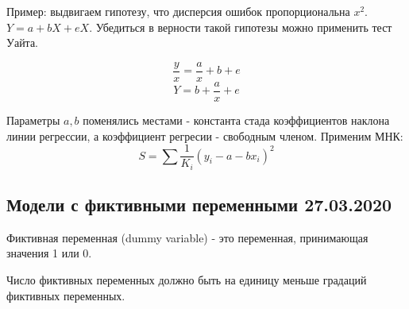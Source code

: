 \documentclass[aps,%
12pt,%
final,%
oneside,
onecolumn,%
musixtex, %
superscriptaddress,%
centertags]{article} %
\begin{document}
Пример: выдвигаем гипотезу, что дисперсия ошибок пропорциональна $x^2$. $Y=a+bX+eX$. Убедиться в верности такой гипотезы можно применить тест Уайта.

$$\frac{y}{x} = \frac{a}{x} + b + e$$
$$Y = b +\frac{a}{x} + e$$

Параметры $a,b$ поменялись местами - константа стада коэффициентов наклона линии регрессии, а коэффициент регресии - свободным членом.
Применим МНК:
$$ S = \sum \frac{1}{K_i}(y_i - a - bx_i)^2$$

\subsection{Модели с фиктивными переменными 27.03.2020}

Фиктивная переменная (dummy variable) - это переменная, принимающая значения 1 или 0. 

Число фиктивных переменных должно быть на единицу меньше градаций фиктивных переменных.
\end{document}
